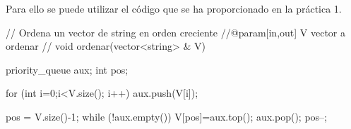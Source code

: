 \-Para ello se puede utilizar el código que se ha proporcionado en la práctica 1.


\begin{DoxyCode}
// Ordena un vector de string en orden creciente 
//@param[in,out] V vector a ordenar
//
void ordenar(vector<string> & V){

 priority_queue aux;
 int pos;

 for (int i=0;i<V.size(); i++)
   aux.push(V[i]);

 pos = V.size()-1;
 while (!aux.empty()) {
   V[pos]=aux.top();
   aux.pop();
   pos--;
 }
}
\end{DoxyCode}
 